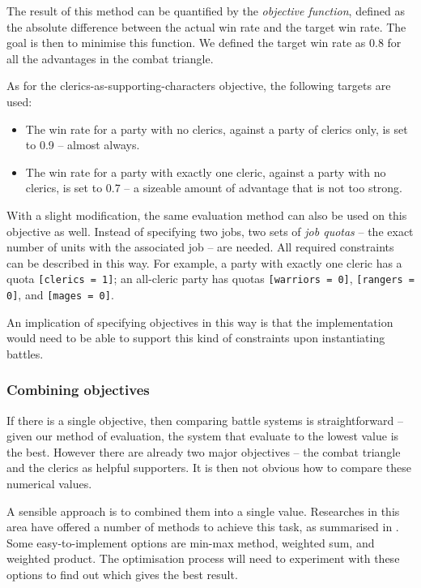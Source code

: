 The result of this method can be quantified by the \textit{objective function}, defined as the absolute difference between the actual win rate and the target win rate. The goal is then to minimise this function. We defined the target win rate as $0.8$ for all the advantages in the combat triangle.

As for the clerics-as-supporting-characters objective, the following targets are used:
\begin{itemize}

\item The win rate for a party with no clerics, against a party of clerics only, is set to 0.9 -- almost always. 
\item The win rate for a party with exactly one cleric, against a party with no clerics, is set to 0.7 -- a sizeable amount of advantage that is not too strong.
\end{itemize}

With a slight modification, the same evaluation method can also be used on this objective as well. Instead of specifying two jobs, two sets of \textit{job quotas} -- the exact number of units with the associated job -- are needed. All required constraints can be described in this way. For example, a party with exactly one cleric has a quota \texttt{[clerics = 1]}; an all-cleric party has quotas \texttt{[warriors = 0]}, \texttt{[rangers = 0]}, and \texttt{[mages = 0]}.

An implication of specifying objectives in this way is that the implementation would need to be able to support this kind of constraints upon instantiating battles.

\subsubsection*{Combining objectives}

If there is a single objective, then comparing battle systems is straightforward -- given our method of evaluation, the system that evaluate to the lowest value is the best. However there are already two major objectives -- the combat triangle and the clerics as helpful supporters. It is then not obvious how to compare these numerical values.

A sensible approach is to combined them into a single value. Researches in this area have offered a number of methods to achieve this task, as summarised in \cite{marler2004survey}. Some easy-to-implement options are min-max method, weighted sum, and weighted product. The optimisation process will need to experiment with these options to find out which gives the best result.

